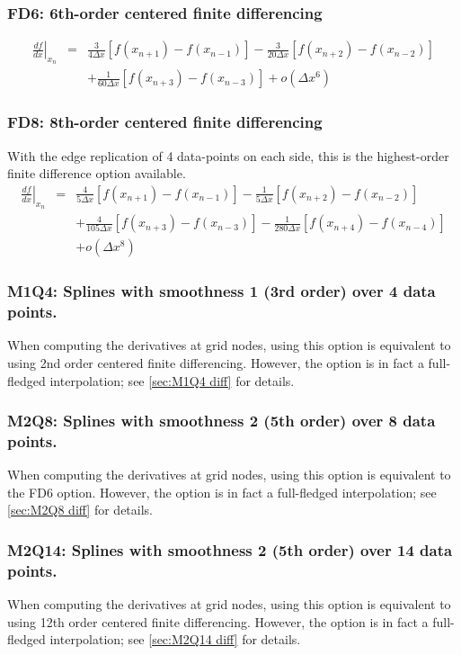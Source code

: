 \documentclass[11pt]{article}
\def\bea{\begin{eqnarray}}
\def\eea{\end{eqnarray}}
\begin{document}
\subsubsection*{FD6: 6th-order centered finite differencing}

\bea \left.\frac{df}{dx}\right|_{x_n} &=&
\frac{3}{4\Delta
x}[f(x_{n+1})-f(x_{n-1})]-\frac{3}{20\Delta x}[f(x_{n+2})-f(x_{n-2})]\nonumber\\
&&+\frac{1}{60\Delta x}[f(x_{n+3})-f(x_{n-3})]+o(\Delta x^6) \eea

\subsubsection*{FD8: 8th-order centered finite differencing}
With the edge replication of 4 data-points on each side, this is the highest-order finite difference option available.
\bea \left.\frac{df}{dx}\right|_{x_n} &=&
\frac{4}{5\Delta
x}[f(x_{n+1})-f(x_{n-1})]-\frac{1}{5\Delta x}[f(x_{n+2})-f(x_{n-2})]\nonumber\\
&&+\frac{4}{105\Delta x}[f(x_{n+3})-f(x_{n-3})]-\frac{1}{280\Delta
x}[f(x_{n+4})-f(x_{n-4})]\nonumber\\
&& +o(\Delta x^8) \eea
\subsubsection*{M1Q4: Splines with smoothness 1 (3rd order) over 4 data points.}
When computing the derivatives at grid nodes, using this option is equivalent to using 2nd order centered finite
differencing.
However, the option is in fact a full-fledged interpolation; see \ref{sec:M1Q4 diff} for details.
\subsubsection*{M2Q8: Splines with smoothness 2 (5th order) over 8 data points.}
When computing the derivatives at grid nodes, using this option is equivalent to the FD6 option.
However, the option is in fact a full-fledged interpolation; see \ref{sec:M2Q8 diff} for details.
\subsubsection*{M2Q14: Splines with smoothness 2 (5th order) over 14 data points.}
When computing the derivatives at grid nodes, using this option is equivalent to using 12th order centered finite
differencing.
However, the option is in fact a full-fledged interpolation; see \ref{sec:M2Q14 diff} for details.
\end{document}
